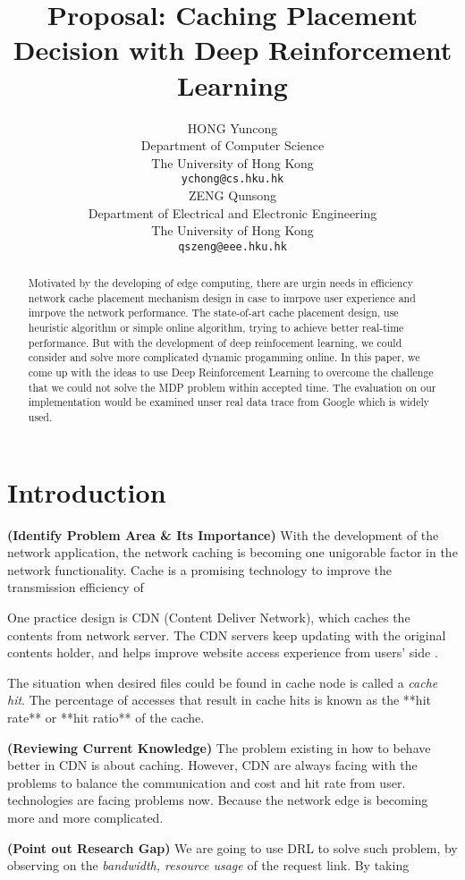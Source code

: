 \documentclass{article}
\title{Proposal: Caching Placement Decision with Deep Reinforcement Learning}
\author{
  HONG Yuncong \\ %
  Department of Computer Science \\
  The University of Hong Kong \\
  \texttt{ychong@cs.hku.hk} \\
  \And %
  ZENG Qunsong \\
  Department of Electrical and Electronic Engineering \\
  The University of Hong Kong \\
  \texttt{qszeng@eee.hku.hk} \\
}
\begin{document}
\maketitle

\begin{abstract}
  Motivated by the developing of edge computing, there are urgin needs in efficiency network cache placement mechanism design in case to imrpove user experience and imrpove the network performance.
  The state-of-art cache placement design, use heuristic algorithm or simple online algorithm, trying to achieve better real-time performance. But with the development of deep reinfocement learning, we could consider and solve more complicated dynamic progamming online.
  In this paper, we come up with the ideas to use Deep Reinforcement Learning to overcome the challenge that we could not solve the MDP problem within accepted time.
  The evaluation on our implementation would be examined unser real data trace from Google which is widely used.
\end{abstract}

\section{Introduction}
  \textbf{(Identify Problem Area \& Its Importance)}
  With the development of the network application, the network caching is becoming one unigorable factor in the network functionality.
  Cache is a promising technology to improve the transmission efficiency of 

  One practice design is CDN (Content Deliver Network), which caches the contents from network server. The CDN servers keep updating with the original contents holder, and helps improve website access experience from users' side \cite{cloudflare}.

  The situation when desired files could be found in cache node is called a \textit{cache hit}. The percentage of accesses that result in cache hits is known as the **hit rate** or **hit ratio** of the cache.

  \textbf{(Reviewing Current Knowledge)}
  The problem existing in how to behave better in CDN is about caching.
  However, CDN are always facing with the problems to balance the communication and cost and hit rate from user.
  technologies are facing problems now. Because the network edge is becoming more and more complicated.

  \textbf{(Point out Research Gap)}
  We are going to use DRL to solve such problem, by observing on the \textit{bandwidth, resource usage} of the request link. By taking 
\end{document}
